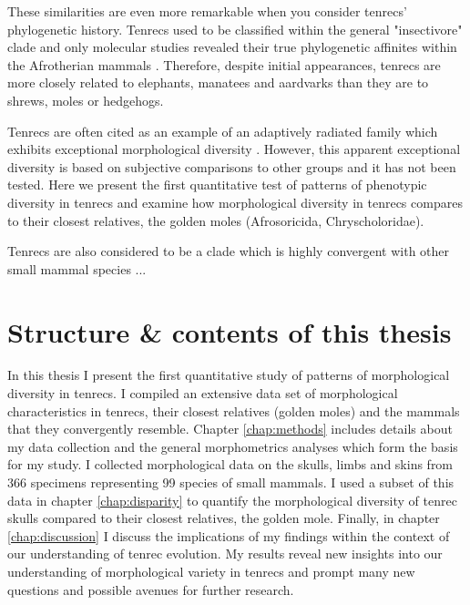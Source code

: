 	These similarities are even more remarkable when you consider tenrecs' phylogenetic history. Tenrecs used to be classified within the general "insectivore" clade and only molecular studies revealed their true phylogenetic affinites within the Afrotherian mammals \citep{Stanhope1998}. Therefore, despite initial appearances, tenrecs are more closely related to elephants, manatees and aardvarks than they are to shrews, moles or hedgehogs. 





	
 
	


	Tenrecs are often cited as an example of an adaptively radiated family which exhibits exceptional morphological diversity \citep{Soarimalala2011, Olson2003, Eisenberg1969}. However, this apparent exceptional diversity is based on subjective comparisons to other groups and it has not been tested. Here we present the first quantitative test of patterns of phenotypic diversity in tenrecs and examine how morphological diversity in tenrecs compares to their closest relatives, the golden moles (Afrosoricida, Chryscholoridae). 
	

	
	Tenrecs are also considered to be a clade which is highly convergent with other small mammal species ...


\section{Structure \& contents of this thesis}
	
	In this thesis I present the first quantitative study of patterns of morphological diversity in tenrecs. I compiled an extensive data set of morphological characteristics in tenrecs, their closest relatives (golden moles) and the mammals that they convergently resemble. Chapter \ref{chap:methods} includes details about my data collection and the general morphometrics analyses which form the basis for my study. I collected morphological data on the skulls, limbs and skins from 366 specimens representing 99 species of small mammals. 
	I used a subset of this data in chapter \ref{chap:disparity} to quantify the morphological diversity of tenrec skulls compared to their closest relatives, the golden mole. Finally, in chapter \ref{chap:discussion} I discuss the implications of my findings within the context of our understanding of tenrec evolution.	
 	My results reveal new insights into our understanding of morphological variety in tenrecs and prompt many new questions and possible avenues for further research.


